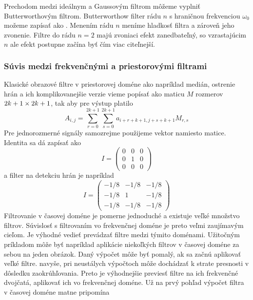 Prechodom medzi ideálnym a Gaussovým filtrom môžeme vyplniť
Butterworthovým filtrom.
Butterworthow filter rádu $n$ s hraničnou frekvenciou $\omega_0$
možeme zapísať ako
.
Menením rádu $n$ meníme hladkosť filtra a zároveň jeho zvonenie.
Filtre do rádu $n=2$ majú zvoniaci efekt zanedbateľný, so vzrastajúcim
$n$ ale efekt postupne začína byť čím viac citeľnejší.

\subsubsection{Súvis medzi frekvenčnými a priestorovými filtrami}
Klasické obrazové filtre v priestorovej doméne ako napríklad medián, 
ostrenie hrán a
ich komplikovanejšie verzie vieme popísať ako maticu $M$ rozmerov $2k+1 \times
2k+1$, tak aby pre výstup platilo 
\begin{equation}
    A_{i,j} = \sum_{r=0}^{2k+1} \sum_{s=0}^{2k+1} a_{i+r+k+1, j+s+k+1} M_{r,s}
\end{equation}
Pre jednorozmerné signály samozrejme použijeme vektor namiesto matice.
Identita sa dá zapísať ako 
\begin{equation}
    I = \begin{pmatrix}
            0 & 0 & 0 \\
            0 & 1 & 0 \\
            0 & 0 & 0
        \end{pmatrix}
\end{equation}
a filter na detekciu hrán je napríklad
\begin{equation}
    I = \begin{pmatrix}
            -1/8 & -1/8 & -1/8 \\
            -1/8 & 1 & -1/8 \\
            -1/8 & -1/8 & -1/8
        \end{pmatrix}
\end{equation}
Filtrovanie v časovej doméne je pomerne jednoduché a existuje veľké
množstvo filtrov. Súvislosť s filtrovaním vo frekvenčnej doméne je
preto veľmi zaujímavým cieľom. Je výhodné vedieť prevádzať filtre
medzi týmito doménami. Užitočným príkladom môže byť napríklad
aplikácie niekoľkých filtrov v časovej doméne za sebou na jeden obrázok.
Daný výpočet môže byť pomalý, ak sa začnú aplikovať veľké filtre.
navyše, pri neustálych výpočtoch môže dochádzať k strate presnosti v
dôsledku zaokrúhľovania. Preto je výhodnejšie previesť filtre na ich
frekvenčné dvojčatá, aplikovať ich vo frekvenčnej doméne.
Už na prvý pohľad výpočet filtra v časovej doméne matne pripomína
